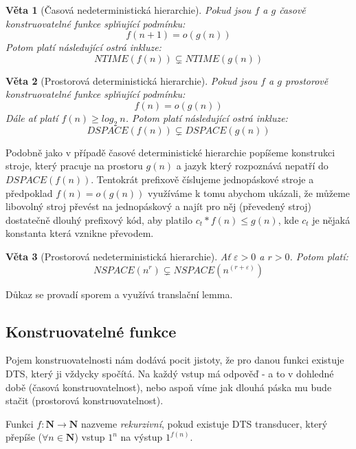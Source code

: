 \documentclass[a4paper]{article}      %
\newtheorem{theorem}{Věta}[section]
\newenvironment{proof}[1][Důkaz]{\begin{trivlist}
\item[\hskip \labelsep {\bfseries #1}]}{\end{trivlist}}
\newenvironment{definition}[1][Definice]{\begin{trivlist}
\item[\hskip \labelsep {\bfseries #1}]}{\end{trivlist}}
\begin{document}
\begin{theorem}[Časová nedeterministická hierarchie]
Pokud jsou $f$ a $g$ časově konstruovatelné funkce splňující podmínku:
\[
f(n+1) = o(g(n))
\]
Potom platí následující ostrá inkluze:
\[
NTIME(f(n)) \subsetneq NTIME(g(n))
\]
\end{theorem}

\begin{theorem}[Prostorová deterministická hierarchie]
Pokud jsou $f$ a $g$ prostorově konstruovatelné funkce splňující podmínku:
\[
f(n) = o(g(n))
\]
Dále ať platí $f(n)\geq log_{2}\ n$.
Potom platí následující ostrá inkluze:
\[
DSPACE(f(n)) \subsetneq DSPACE(g(n))
\]
\end{theorem}

\begin{proof}
Podobně jako v případě časové deterministické hierarchie popíšeme konstrukci stroje, který pracuje na prostoru $g(n)$ a
jazyk který rozpoznává nepatří do $DSPACE(f(n))$. Tentokrát prefixově číslujeme jednopáskové stroje a
předpoklad $f(n) = o(g(n))$ využíváme k tomu abychom ukázali, že můžeme libovolný stroj převést na jednopáskový a
najít pro něj (převedený stroj) dostatečně dlouhý prefixový kód, aby platilo $c_{t}*f(n) \leq g(n)$, kde $c_t$ je nějaká konstanta která vznikne převodem.
\end{proof}

\begin{theorem}[Prostorová nedeterministická hierarchie]
Ať $\varepsilon > 0$ a $r > 0$. Potom platí:
\[
NSPACE(n^{r}) \subsetneq NSPACE(n^{(r+\varepsilon)})
\]
\end{theorem}

\begin{proof}
Důkaz se provadí sporem a využívá translační lemma.
\end{proof}


\subsection{Konstruovatelné funkce}
Pojem konstruovatelnosti nám dodává pocit jistoty, že pro danou funkci existuje DTS, který ji vždycky spočítá.
Na každý vstup má odpověď - a to v dohledné době (časová konstruovatelnost), nebo aspoň víme jak dlouhá páska mu bude stačit (prostorová konstruovatelnost).

\begin{definition}[Rekurzivní funkce]
Funkci $f: \mathbf{N} \rightarrow \mathbf{N}$ nazveme \emph{rekurzivní}, pokud existuje DTS transducer,
který přepíše ($\forall n\in \mathbf{N}$) vstup $1^{n}$ na výstup $1^{f(n)}$.
\end{definition}
\end{document}
